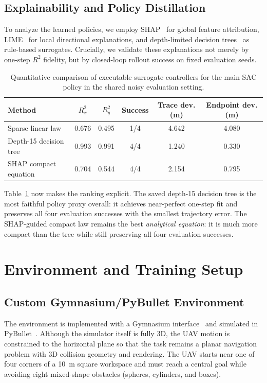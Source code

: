 \documentclass[runningheads]{llncs}
\begin{document}
\subsection{Explainability and Policy Distillation}
To analyze the learned policies, we employ SHAP~\cite{Lundberg2017SHAP} for global feature attribution, LIME~\cite{Ribeiro2016LIME} for local directional explanations, and depth-limited decision trees~\cite{Bastani2018VIPER} as rule-based surrogates. Crucially, we validate these explanations not merely by one-step $R^2$ fidelity, but by closed-loop rollout success on fixed evaluation seeds.

\begin{table}[!tb]
\caption{Quantitative comparison of executable surrogate controllers for the main SAC policy in the shared noisy evaluation setting.}
\label{tab:xai_methods}
\centering
\footnotesize
\begin{tabular}{lccccc}
\toprule
Method & $R^2_x$ & $R^2_y$ & Success & Trace dev. (m) & Endpoint dev. (m) \\
\midrule
Sparse linear law & 0.676 & 0.495 & 1/4 & 4.642 & 4.080 \\
Depth-15 decision tree & 0.993 & 0.991 & 4/4 & 1.240 & 0.330 \\
SHAP compact equation & 0.704 & 0.544 & 4/4 & 2.154 & 0.795 \\
\bottomrule
\end{tabular}
\end{table}

Table~\ref{tab:xai_methods} now makes the ranking explicit. The saved depth-15 decision tree is the most faithful policy proxy overall: it achieves near-perfect one-step fit and preserves all four evaluation successes with the smallest trajectory error. The SHAP-guided compact law remains the best \emph{analytical equation}: it is much more compact than the tree while still preserving all four evaluation successes.

\section{Environment and Training Setup}
\subsection{Custom Gymnasium/PyBullet Environment}
The environment is implemented with a Gymnasium interface~\cite{Brockman2016Gym} and simulated in PyBullet~\cite{Coumans2021PyBullet}. Although the simulator itself is fully 3D, the UAV motion is constrained to the horizontal plane so that the task remains a planar navigation problem with 3D collision geometry and rendering. The UAV starts near one of four corners of a \SI{10}{m} square workspace and must reach a central goal while avoiding eight mixed-shape obstacles (spheres, cylinders, and boxes).
\end{document}

